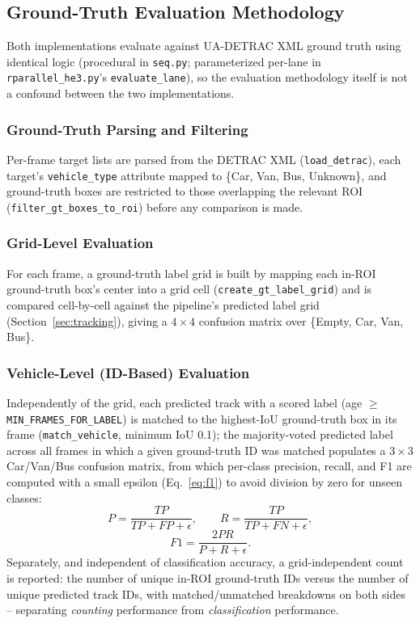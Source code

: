 \documentclass[conference]{IEEEtran}
\newcommand{\code}[1]{\texttt{#1}}
\begin{document}
\subsection{Ground-Truth Evaluation Methodology}
\label{sec:eval}

Both implementations evaluate against UA-DETRAC XML ground truth
\cite{wen2020} using identical logic (procedural in \code{seq.py};
parameterized per-lane in \code{rparallel\_he3.py}'s
\code{evaluate\_lane}), so the evaluation methodology itself is not a
confound between the two implementations.

\subsubsection{Ground-Truth Parsing and Filtering}
Per-frame target lists are parsed from the DETRAC XML
(\code{load\_detrac}), each target's \code{vehicle\_type} attribute
mapped to \{Car, Van, Bus, Unknown\}, and ground-truth boxes are
restricted to those overlapping the relevant ROI
(\code{filter\_gt\_boxes\_to\_roi}) before any comparison is made.

\subsubsection{Grid-Level Evaluation}
For each frame, a ground-truth label grid is built by mapping each
in-ROI ground-truth box's center into a grid cell
(\code{create\_gt\_label\_grid}) and is compared cell-by-cell against
the pipeline's predicted label grid (Section~\ref{sec:tracking}), giving
a $4\times4$ confusion matrix over \{Empty, Car, Van, Bus\}.

\subsubsection{Vehicle-Level (ID-Based) Evaluation}
Independently of the grid, each predicted track with a scored label
(age $\geq$ \code{MIN\_FRAMES\_FOR\_LABEL}) is matched to the
highest-IoU ground-truth box in its frame (\code{match\_vehicle},
minimum IoU 0.1); the majority-voted predicted label across all frames
in which a given ground-truth ID was matched populates a
$3\times3$ Car/Van/Bus confusion matrix, from which per-class precision,
recall, and F1 are computed with a small epsilon (Eq.~\eqref{eq:f1}) to
avoid division by zero for unseen classes:
\begin{equation}
P = \frac{TP}{TP+FP+\epsilon},\qquad
R = \frac{TP}{TP+FN+\epsilon},
\label{eq:f1}
\end{equation}
\begin{equation}
F1 = \frac{2PR}{P+R+\epsilon}.
\label{eq:f1b}
\end{equation}
Separately, and independent of classification accuracy, a
grid-independent count is reported: the number of unique in-ROI
ground-truth IDs versus the number of unique predicted track IDs, with
matched/unmatched breakdowns on both sides -- separating \emph{counting}
performance from \emph{classification} performance.
\end{document}
